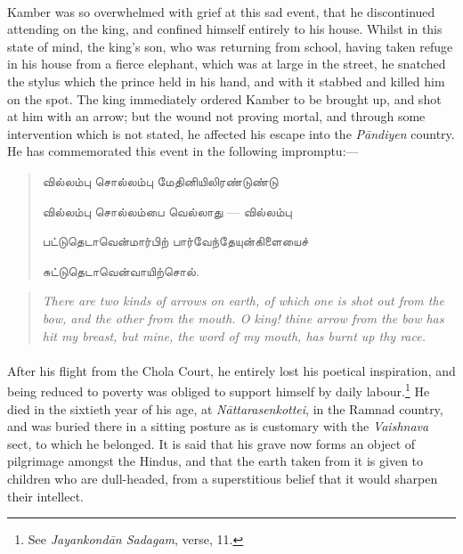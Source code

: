 \documentclass{article}
\newcommand{\TamilText}[1]{\texttamil{#1}}
\newcommand{\tam}[1]{\TamilText{#1}}
\begin{document}
\paragraph{}
Kamber was so overwhelmed with grief at this sad event, that he discontinued attending on the king, and confined himself entirely to his house. Whilst in this state of mind, the king's son, who was returning from school, having taken refuge in his house from a fierce elephant, which was at large in the street, he snatched the stylus which the prince held in his hand, and with it stabbed and killed him on the spot. The king immediately ordered Kamber to be brought up, and shot at him with an arrow; but the wound not proving mortal, and through some intervention which is not stated, he affected his escape into the \emph{P\={a}ndiyen} country. He has commemorated this event in the following impromptu:---
\begin{quotation}\small
\tam{வில்லம்பு சொல்லம்பு மேதினியிலிரண்டுண்டு}

\tam{வில்லம்பு சொல்லம்பை வெல்லாது} --- \tam{வில்லம்பு}

\tam{பட்டுதெடாவென்மார்பிற்‌ பார்வேந்தேயுன்கிளையைச்‌}

\tam{சுட்டுதெடாவென்வாயிற்சொல்‌}.
\end{quotation}
\begin{quotation}\small
\emph{There are two kinds of arrows on earth, of which one is shot out from the bow, and the other from the mouth. O king! thine arrow from the bow has hit my breast, but mine, the word of my mouth, has burnt up thy race.}
\end{quotation}
\paragraph{}
After his flight from the Chola Court, he entirely lost his poetical inspiration, and being reduced to poverty was obliged to support himself by daily labour.\footnote{See \emph{Jayankond\={a}n Sadagam}, verse, 11.} He died in the sixtieth year of his age, at \emph{N\={a}ttarasenkottei}, in the Ramnad country, and was buried there in a sitting posture as is customary with the \emph{Vaishnava} sect, to which he belonged. It is said that his grave now forms an object of pilgrimage amongst the Hindus, and that the earth taken from it is given to children who are dull-headed, from a superstitious belief that it would sharpen their intellect.
\end{document}
